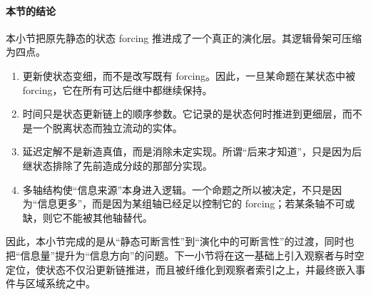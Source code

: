 \paragraph{本节的结论}
本小节把原先静态的状态 forcing 推进成了一个真正的演化层。其逻辑骨架可压缩为四点。
\begin{enumerate}
  \item 更新使状态变细，而不是改写既有 forcing。因此，一旦某命题在某状态中被 forcing，它在所有可达后继中都继续保持。
  \item 时间只是状态更新链上的顺序参数。它记录的是状态何时推进到更细层，而不是一个脱离状态而独立流动的实体。
  \item 延迟定解不是新造真值，而是消除未定实现。所谓“后来才知道”，只是因为后继状态排除了先前造成分歧的那部分实现。
  \item 多轴结构使“信息来源”本身进入逻辑。一个命题之所以被决定，不只是因为“信息更多”，而是因为某组轴已经足以控制它的 forcing；若某条轴不可或缺，则它不能被其他轴替代。
\end{enumerate}

因此，本小节完成的是从“静态可断言性”到“演化中的可断言性”的过渡，同时也把“信息量”提升为“信息方向”的问题。下一小节将在这一基础上引入观察者与时空定位，使状态不仅沿更新链推进，而且被纤维化到观察者索引之上，并最终嵌入事件与区域系统之中。
